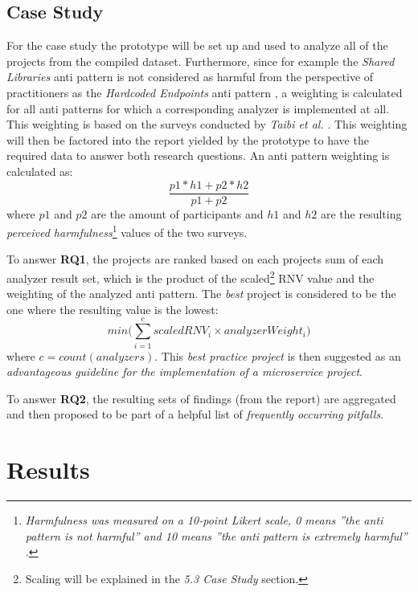 \documentclass{article}
\begin{document}
\subsection{Case Study}
For the case study the prototype will be set up and used to analyze all of the projects from the compiled dataset.
Furthermore, since for example the \textit{Shared Libraries} anti pattern is not considered as harmful from the perspective of practitioners as the \textit{Hardcoded Endpoints} anti pattern \cite{taibi_definition_2018, taibi_microservices_2020}, a weighting is calculated for all anti patterns for which a corresponding analyzer is implemented at all. This weighting is based on the surveys conducted by \textit{Taibi et al.} \cite{taibi_definition_2018, taibi_microservices_2020}. This weighting will then be factored into the report yielded by the prototype to have the required data to answer both research questions. An anti pattern weighting is calculated as: 
\begin{equation}
    \frac{p1 * h1 + p2 * h2}{p1 + p2}
\end{equation}
where $p1$ and $p2$ are the amount of participants and $h1$ and $h2$ are the resulting \textit{perceived harmfulness}\footnote{\textit{Harmfulness was measured on a 10-point Likert scale, 0 means ”the anti pattern is not harmful” and 10 means ”the anti pattern is extremely harmful”} \cite{taibi_microservices_2020}.} values of the two surveys. \newline

To answer \textbf{RQ1}, the projects are ranked based on each projects sum of each analyzer result set, which is the product of the scaled\footnote{Scaling will be explained in the \textit{5.3 Case Study} section.} RNV value and the weighting of the analyzed anti pattern. The \textit{best} project is considered to be the one where the resulting value is the lowest:
\begin{equation}
    min\bigg(\sum_{i=1}^{c} scaledRNV_i \times analyzerWeight_i\bigg)
\end{equation}
where $c = count(analyzers)$. This \textit{best practice project} is then suggested as an \textit{advantageous guideline for the implementation of a microservice project}. \newline

To answer \textbf{RQ2}, the resulting sets of findings (from the report) are aggregated and then proposed to be part of a helpful list of \textit{frequently occurring pitfalls}.

\section{Results}
\end{document}
